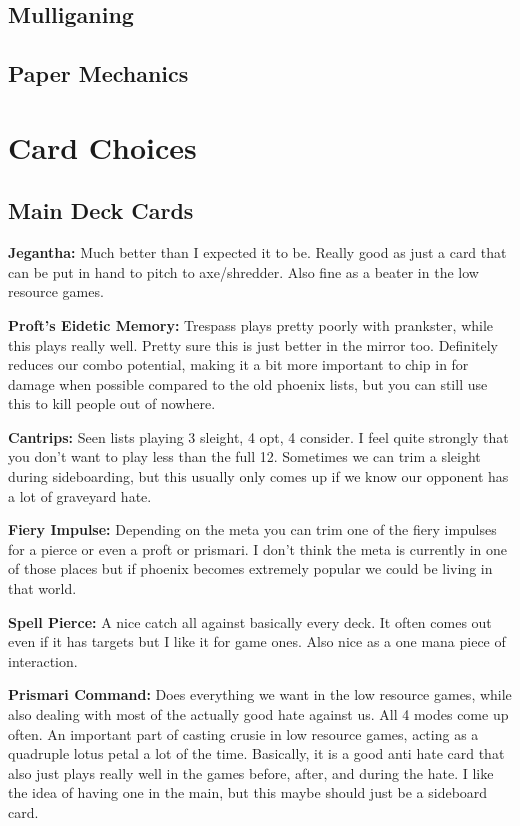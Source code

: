 \documentclass[12pt]{article}
\begin{document}
\subsection{Mulliganing}

\subsection{Paper Mechanics}

\clearpage
\section{Card Choices}
\subsection{Main Deck Cards}
\label{sec:mainchoices}
\textbf{Jegantha:}
Much better than I expected it to be. Really good as just a card that can be put in hand to pitch to axe/shredder. Also fine as a beater in the low resource games.

\vspace{0.4em}
\noindent \textbf{Proft's Eidetic Memory:}
Trespass plays pretty poorly with prankster, while this plays really well. Pretty sure this is just better in the mirror too. Definitely reduces our combo potential, making it a bit more important to chip in for damage when possible compared to the old phoenix lists, but you can still use this to kill people out of nowhere.

\vspace{0.4em}
\noindent \textbf{Cantrips:}
Seen lists playing 3 sleight, 4 opt, 4 consider. I feel quite strongly that you don't want to play less than the full 12. Sometimes we can trim a sleight during sideboarding, but this usually only comes up if we know our opponent has a lot of graveyard hate.

\vspace{0.4em}
\noindent \textbf{Fiery Impulse:}
Depending on the meta you can trim one of the fiery impulses for a pierce or even a proft or prismari. I don't think the meta is currently in one of those places but if phoenix becomes extremely popular we could be living in that world.

\vspace{0.4em}
\noindent \textbf{Spell Pierce:}
A nice catch all against basically every deck. It often comes out even if it has targets but I like it for game ones. Also nice as a one mana piece of interaction.

\vspace{0.4em}
\noindent \textbf{Prismari Command:}
Does everything we want in the low resource games, while also dealing with most of the actually good hate against us. All 4 modes come up often. An important part of casting crusie in low resource games, acting as a quadruple lotus petal a lot of the time. Basically, it is a good anti hate card that also just plays really well in the games before, after, and during the hate. I like the idea of having one in the main, but this maybe should just be a sideboard card.
\end{document}

